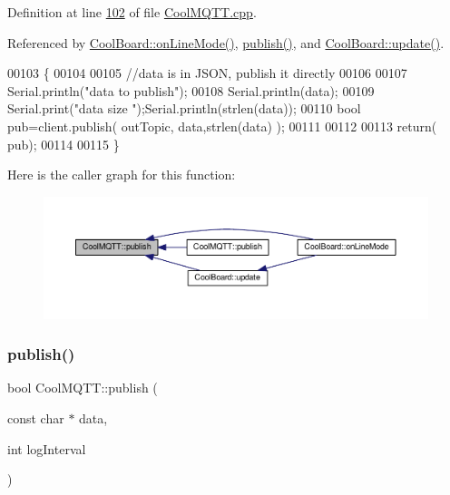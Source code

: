 Definition at line \hyperlink{_cool_m_q_t_t_8cpp_source_l00102}{102} of file \hyperlink{_cool_m_q_t_t_8cpp_source}{Cool\+M\+Q\+T\+T.\+cpp}.



Referenced by \hyperlink{_cool_board_8cpp_source_l00097}{Cool\+Board\+::on\+Line\+Mode()}, \hyperlink{_cool_m_q_t_t_8cpp_source_l00125}{publish()}, and \hyperlink{_cool_board_8cpp_source_l00411}{Cool\+Board\+::update()}.


\begin{DoxyCode}
00103 \{
00104 
00105     \textcolor{comment}{//data is in JSON, publish it directly}
00106 
00107     Serial.println(\textcolor{stringliteral}{"data to publish"});
00108     Serial.println(data);
00109     Serial.print(\textcolor{stringliteral}{"data size "});Serial.println(strlen(data));
00110     \textcolor{keywordtype}{bool} pub=client.publish( outTopic, data,strlen(data) );
00111 
00112 
00113     \textcolor{keywordflow}{return}( pub);
00114 
00115 \}
\end{DoxyCode}
Here is the caller graph for this function\+:
\nopagebreak
\begin{figure}[H]
\begin{center}
\leavevmode
\includegraphics[width=350pt]{class_cool_m_q_t_t_ace977b3e90ab14b1199fe5c4fb0a13ec_icgraph}
\end{center}
\end{figure}
\mbox{\label{class_cool_m_q_t_t_a65a506641740ce797ceadd4fa8a286d3}} 
\subsubsection{\texorpdfstring{publish()}{publish()}\hspace{0.1cm}{\footnotesize\ttfamily [2/2]}}
{\footnotesize\ttfamily bool Cool\+M\+Q\+T\+T\+::publish (\begin{DoxyParamCaption}\item[{const char $\ast$}]{data,  }\item[{int}]{log\+Interval }\end{DoxyParamCaption})}

